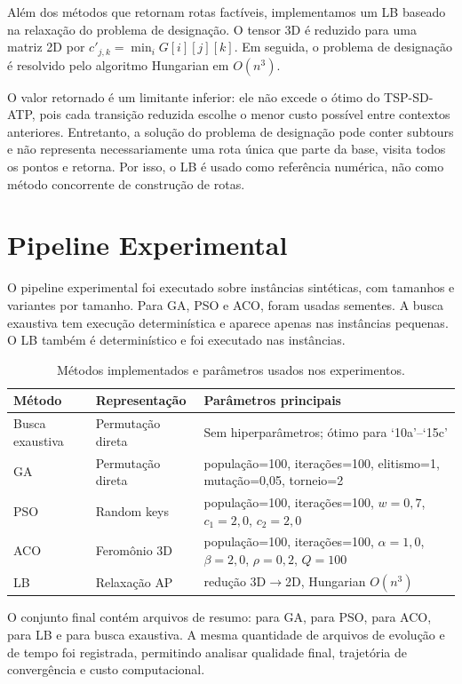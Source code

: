 Além dos métodos que retornam rotas factíveis, implementamos um \ac{LB} baseado na relaxação do problema de designação. O tensor 3D é reduzido para uma matriz 2D por $c'_{j,k}=\min_i G[i][j][k]$. Em seguida, o problema de designação é resolvido pelo algoritmo Hungarian em $O(n^3)$.

O valor retornado é um limitante inferior: ele não excede o ótimo do \ac{TSP-SD-ATP}, pois cada transição reduzida escolhe o menor custo possível entre contextos anteriores. Entretanto, a solução do problema de designação pode conter subtours e não representa necessariamente uma rota única que parte da base, visita todos os pontos e retorna. Por isso, o \ac{LB} é usado como referência numérica, não como método concorrente de construção de rotas.

\section{Pipeline Experimental}

O pipeline experimental foi executado sobre \TotalInstancias{} instâncias sintéticas, com \TotalTamanhosInstancia{} tamanhos e \TotalVariantesPorTamanho{} variantes por tamanho. Para \ac{GA}, \ac{PSO} e \ac{ACO}, foram usadas \TotalSementesGA{} sementes. A busca exaustiva tem execução determinística e aparece apenas nas \TotalInstanciasComOtimo{} instâncias pequenas. O \ac{LB} também é determinístico e foi executado nas \TotalInstancias{} instâncias.

\begin{table}[htbp]
  \centering
  \caption{Métodos implementados e parâmetros usados nos experimentos.}
  \label{tab:metodos-parametros}
  \scriptsize
  \begin{tabularx}{\textwidth}{llX}
    \toprule
    Método & Representação & Parâmetros principais \\
    \midrule
    Busca exaustiva & Permutação direta & Sem hiperparâmetros; ótimo para `10a'--`15c' \\
    \ac{GA} & Permutação direta & população=100, iterações=100, elitismo=1, mutação=0{,}05, torneio=2 \\
    \ac{PSO} & Random keys & população=100, iterações=100, $w=0{,}7$, $c_1=2{,}0$, $c_2=2{,}0$ \\
    \ac{ACO} & Feromônio 3D & população=100, iterações=100, $\alpha=1{,}0$, $\beta=2{,}0$, $\rho=0{,}2$, $Q=100$ \\
    \ac{LB} & Relaxação \ac{AP} & redução 3D$\to$2D, Hungarian $O(n^3)$ \\
    \bottomrule
  \end{tabularx}
\end{table}

O conjunto final contém \TotalArquivosResumo{} arquivos de resumo: \TotalExecucoesGA{} para \ac{GA}, \TotalExecucoesPSO{} para \ac{PSO}, \TotalExecucoesACO{} para \ac{ACO}, \TotalExecucoesLB{} para \ac{LB} e \TotalExecucoesBF{} para busca exaustiva. A mesma quantidade de arquivos de evolução e de tempo foi registrada, permitindo analisar qualidade final, trajetória de convergência e custo computacional.
